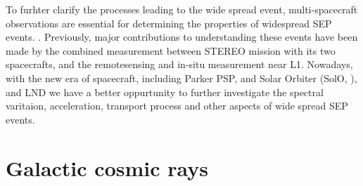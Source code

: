 To furhter clarify the processes leading to the wide spread event, multi-spacecraft observations are essential for determining the properties of widespread SEP events. \citep{Kolhoff2021AA}. Previously, major contributions to understanding these events have been made by the combined measurement between \ac{STEREO} mission with its two spacecrafts, and the remotesensing and in-situ measurement near L1. Nowadays, with the new era of spacecraft, including Parker \ac{PSP},\citet{Fox2016SSRv} and Solar Orbiter (SolO, \citet{Mueller-2020-SolO}), and \ac{LND} \citep{Wimmer2020SSRv} we have a better oppurtunity to further investigate the spectral varitaion, acceleration, transport process and other aspects of wide spread \ac{SEP} events.





\section{Galactic cosmic rays}

